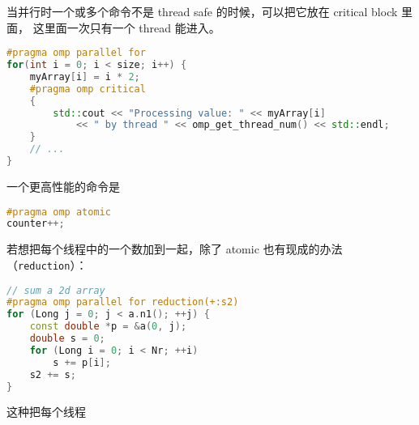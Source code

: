 当并行时一个或多个命令不是 thread safe 的时候，可以把它放在 critical block 里面， 这里面一次只有一个 thread 能进入。
\begin{lstlisting}[language=cpp]
#pragma omp parallel for
for(int i = 0; i < size; i++) {
	myArray[i] = i * 2;
	#pragma omp critical
	{
		std::cout << "Processing value: " << myArray[i]
			<< " by thread " << omp_get_thread_num() << std::endl;
	}
	// ...
}
\end{lstlisting}

一个更高性能的命令是
\begin{lstlisting}[language=cpp]
#pragma omp atomic
counter++;
\end{lstlisting}

若想把每个线程中的一个数加到一起，除了 atomic 也有现成的办法（\verb`reduction`）：
\begin{lstlisting}[language=cpp]
// sum a 2d array
#pragma omp parallel for reduction(+:s2)
for (Long j = 0; j < a.n1(); ++j) {
	const double *p = &a(0, j);
	double s = 0;
	for (Long i = 0; i < Nr; ++i)
		s += p[i];
	s2 += s;
}
\end{lstlisting}
这种把每个线程
